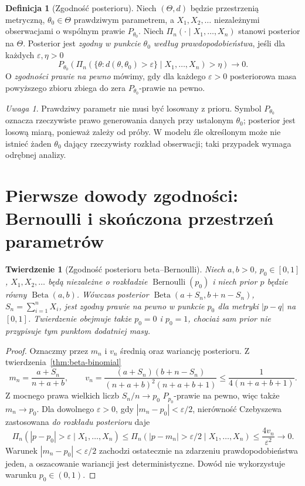 \documentclass[11pt,a4paper,oneside]{report}
\numberwithin{equation}{chapter}
\theoremstyle{plain}
\newtheorem{twierdzenie}{Twierdzenie}[chapter]
\theoremstyle{definition}
\newtheorem{definicja}{Definicja}[chapter]
\theoremstyle{remark}
\newtheorem{uwaga}{Uwaga}[chapter]
\begin{document}
\begin{definicja}[Zgodność posterioru]
\label{def:posterior-consistency}
Niech $(\Theta,d)$ będzie przestrzenią metryczną,
$\theta_0\in\Theta$ prawdziwym parametrem, a
$X_1,X_2,\ldots$ niezależnymi obserwacjami o wspólnym
prawie $P_{\theta_0}$. Niech $\Pi_n(\cdot\mid X_1,\ldots,X_n)$
stanowi posterior na $\Theta$.
Posterior jest \emph{zgodny w punkcie $\theta_0$ według
prawdopodobieństwa}, jeśli dla każdych $\varepsilon,\eta>0$
\[
 P_{\theta_0}\!\left(
 \Pi_n(\{\theta:d(\theta,\theta_0)>\varepsilon\}\mid X_1,\ldots,X_n)
 >\eta\right)\longrightarrow0.
\]
O \emph{zgodności prawie na pewno} mówimy, gdy dla każdego
$\varepsilon>0$ posteriorowa masa powyższego zbioru
zbiega do zera $P_{\theta_0}$-prawie na pewno.
\end{definicja}

\begin{uwaga}
Prawdziwy parametr nie musi być losowany z prioru.
Symbol $P_{\theta_0}$ oznacza rzeczywiste prawo generowania
danych przy ustalonym $\theta_0$; posterior jest losową
miarą, ponieważ zależy od próby. W modelu źle określonym
może nie istnieć żaden $\theta_0$ dający rzeczywisty rozkład
obserwacji; taki przypadek wymaga odrębnej analizy.
\end{uwaga}

\section{Pierwsze dowody zgodności: Bernoulli i skończona przestrzeń parametrów}
\begin{twierdzenie}[Zgodność posterioru beta--Bernoulli]
\label{thm:beta-posterior-consistency}
Niech $a,b>0$, $p_0\in[0,1]$, $X_1,X_2,\ldots$
będą niezależne o rozkładzie $\operatorname{Bernoulli}(p_0)$
i niech prior $p$ będzie równy $\operatorname{Beta}(a,b)$.
Wówczas posterior $\operatorname{Beta}(a+S_n,b+n-S_n)$,
$S_n=\sum_{i=1}^nX_i$, jest zgodny prawie na pewno
w punkcie $p_0$ dla metryki $|p-q|$ na $[0,1]$.
Twierdzenie obejmuje także $p_0=0$ i $p_0=1$,
chociaż sam prior nie przypisuje tym punktom dodatniej masy.
\end{twierdzenie}
\begin{proof}
Oznaczmy przez $m_n$ i $v_n$ średnią oraz wariancję
posterioru. Z twierdzenia~\ref{thm:beta-binomial}
\[
 m_n=\frac{a+S_n}{n+a+b},\qquad
 v_n=\frac{(a+S_n)(b+n-S_n)}{(n+a+b)^2(n+a+b+1)}
 \le\frac1{4(n+a+b+1)}.
\]
Z mocnego prawa wielkich liczb $S_n/n\to p_0$
$P_{p_0}$-prawie na pewno, więc także $m_n\to p_0$.
Dla dowolnego $\varepsilon>0$, gdy
$|m_n-p_0|<\varepsilon/2$, nierówność Czebyszewa
zastosowana \emph{do rozkładu posterioru} daje
\[
 \Pi_n(|p-p_0|>\varepsilon\mid X_1,\ldots,X_n)
 \le\Pi_n(|p-m_n|>\varepsilon/2\mid X_1,\ldots,X_n)
 \le\frac{4v_n}{\varepsilon^2}\longrightarrow0.
\]
Warunek $|m_n-p_0|<\varepsilon/2$ zachodzi ostatecznie
na zdarzeniu prawdopodobieństwa jeden, a oszacowanie
wariancji jest deterministyczne. Dowód nie wykorzystuje
warunku $p_0\in(0,1)$.
\end{proof}
\end{document}
